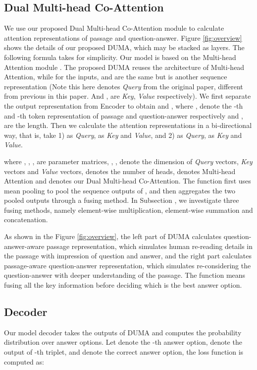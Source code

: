 \documentclass[letterpaper]{article} \usepackage{aaai21}  \usepackage{times}  \usepackage{helvet} \usepackage{courier}  \usepackage[hyphens]{url}  \usepackage{graphicx} \urlstyle{rm} \def\UrlFont{\rm}  \usepackage{natbib}  \usepackage{caption} \frenchspacing  \setlength{\pdfpagewidth}{8.5in}  \setlength{\pdfpageheight}{11in}
\begin{document}
\subsection{Dual Multi-head Co-Attention}



We use our proposed Dual Multi-head Co-Attention module to calculate attention representations of passage and question-answer. Figure \ref{fig:overview} shows the details of our proposed DUMA, which may be stacked as  layers. The following formula takes  for simplicity. Our model is based on the Multi-head Attention module \cite{transformer}. The proposed DUMA reuses the architecture of Multi-head Attention, while for the inputs,  and  are the same but  is another sequence representation (Note this  here denotes \textit{Query} from the original paper, different from previous  in this paper. And ,  are \textit{Key}, \textit{Value} respectively). We first separate the output representation from Encoder to obtain  and , where ,  denote the -th and -th token representation of passage and question-answer respectively and ,  are the length. Then we calculate the attention representations in a bi-directional way, that is, take 1)  as \textit{Query},  as \textit{Key} and \textit{Value}, and 2)  as \textit{Query},  as \textit{Key} and \textit{Value}.




\noindent where , , ,  are parameter matrices, , ,  denote the dimension of \textit{Query} vectors, \textit{Key} vectors and \textit{Value} vectors,  denotes the number of heads,  denotes Multi-head Attention and  denotes our Dual Multi-head Co-Attention. The  function first uses mean pooling to pool the sequence outputs of , and then aggregates the two pooled outputs through a fusing method. In Subsection \textit{}, we investigate three fusing methods, namely element-wise multiplication, element-wise summation and concatenation. 

As shown in the Figure \ref{fig:overview}, the left part of DUMA calculates question-answer-aware passage representation, which simulates human re-reading details in the passage with impression of question and answer, and the right part calculates passage-aware question-answer representation, which simulates re-considering the question-answer with deeper understanding of the passage. The  function means fusing all the key information before deciding which is the best answer option.

\subsection {Decoder}
Our model decoder takes the outputs of DUMA and computes the probability distribution over answer options. Let  denote the -th answer option,  denote the output of -th  triplet, and  denote the correct answer option, the loss function is computed as:
\end{document}
